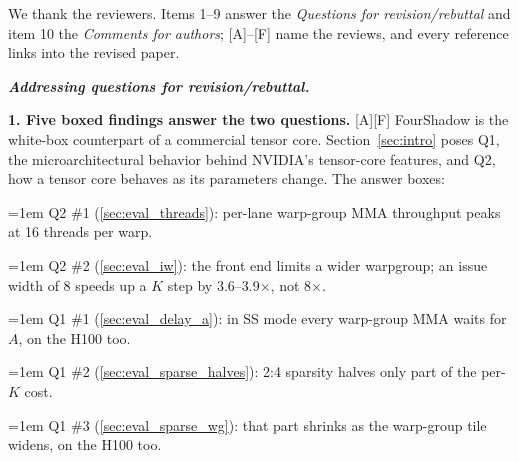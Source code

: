 \thispagestyle{empty}

\noindent We thank the reviewers. Items 1--9 answer the \emph{Questions for revision/rebuttal}
and item 10 the \emph{Comments for authors}; [A]--[F] name the reviews, and every reference links
into the revised paper.

\vspace{3pt}
\noindent\textbf{\emph{Addressing questions for revision/rebuttal.}}

\vspace{1pt}
\noindent\textbf{1. Five boxed findings answer the two questions.} [A][F] FourShadow is the
white-box counterpart of a commercial tensor core. Section~\ref{sec:intro} poses Q1, the
microarchitectural behavior behind NVIDIA's tensor-core features, and Q2, how a tensor core
behaves as its parameters change. The answer boxes:
\par\noindent\hangindent=1em Q2 \#1 (\ref{sec:eval_threads}): per-lane warp-group MMA
throughput peaks at 16 threads per warp.
\par\noindent\hangindent=1em Q2 \#2 (\ref{sec:eval_iw}): the front end
limits a wider warpgroup; an issue width of 8 speeds up a $K$ step by 3.6--3.9$\times$, not 8$\times$.
\par\noindent\hangindent=1em Q1 \#1 (\ref{sec:eval_delay_a}): in SS mode every
warp-group MMA waits for $A$, on the H100 too.
\par\noindent\hangindent=1em Q1 \#2 (\ref{sec:eval_sparse_halves}): 2:4 sparsity
halves only part of the per-$K$ cost.
\par\noindent\hangindent=1em Q1 \#3 (\ref{sec:eval_sparse_wg}): that part shrinks as
the warp-group tile widens, on the H100 too.\par

